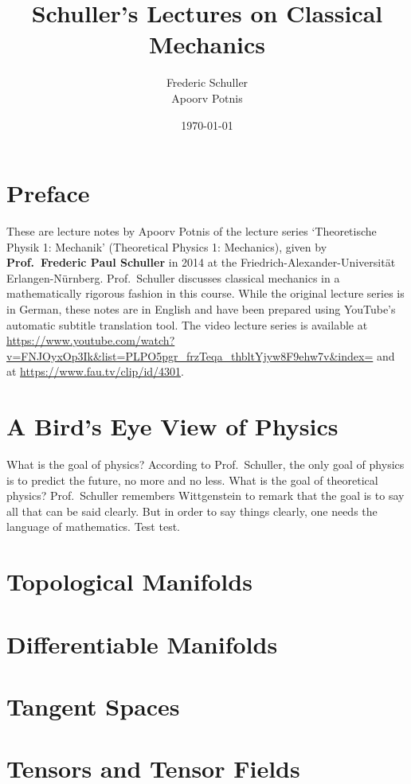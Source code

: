 \documentclass[a4 paper, oneside, 12pt]{book}
\title{Schuller's Lectures on Classical Mechanics}
\author{Frederic Schuller\\Apoorv Potnis}
\date{\today}
\theoremstyle{definition}
\begin{document}
	\hypertarget{TitlePage}{}
	\maketitle

	\chapter*{Preface}
	\hypertarget{Preface}{}
	These are lecture notes by Apoorv Potnis of the lecture series `Theoretische Physik 1: Mechanik' (Theoretical Physics 1: Mechanics), given by \textbf{Prof.\ Frederic Paul Schuller} in 2014 at the Friedrich-Alexander-Universität Erlangen-Nürnberg. Prof.\ Schuller discusses classical mechanics in a mathematically rigorous fashion in this course. While the original lecture series is in German, these notes are in English and have been prepared using YouTube's automatic subtitle translation tool. The video lecture series is available at \url{https://www.youtube.com/watch?v=FNJOyxOp3Ik&list=PLPO5pgr_frzTeqa_thbltYjyw8F9ehw7v&index=} and at \url{https://www.fau.tv/clip/id/4301}.
	\clearpage

	\hypertarget{Contents}{}
	\tableofcontents

	\chapter{A Bird's Eye View of Physics}

	What is the goal of physics? According to Prof.\ Schuller, the only goal of physics is to predict the future, no more and no less. What is the goal of theoretical physics? Prof.\ Schuller remembers Wittgenstein to remark that the goal is to say all that can be said clearly. But in order to say things clearly, one needs the language of mathematics. Test test.

	\chapter{Topological Manifolds}

	\chapter{Differentiable Manifolds}

	\chapter{Tangent Spaces}

	\chapter{Tensors and Tensor Fields}

	\nocite{*}
	\printbibliography[heading=bibintoc]
	\printindex
\end{document}
